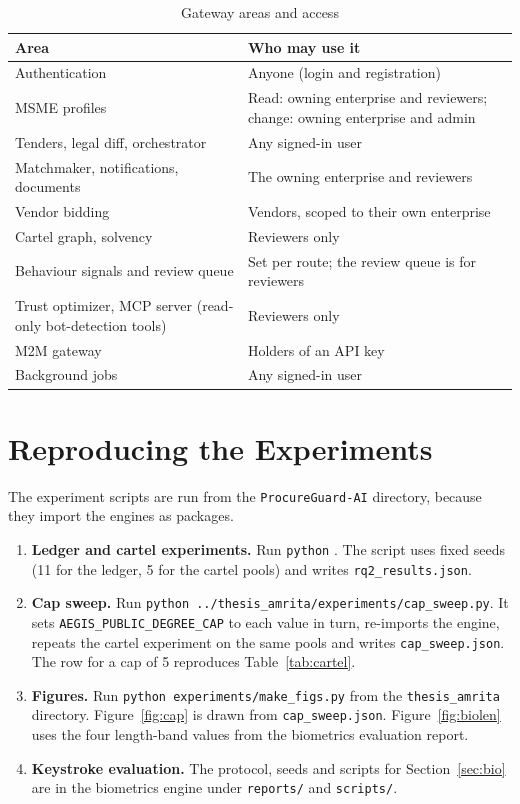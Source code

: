 \begin{table}[htbp]
\centering
\caption{Gateway areas and access}
\label{tab:api}
\small
\renewcommand{\arraystretch}{1.1}
\begin{tabularx}{\textwidth}{@{}>{\raggedright\arraybackslash}p{3.8cm}>{\raggedright\arraybackslash}X@{}}
\toprule
\textbf{Area} & \textbf{Who may use it} \\
\midrule
Authentication & Anyone (login and registration) \\
MSME profiles & Read: owning enterprise and reviewers; change: owning enterprise and admin \\
Tenders, legal diff, orchestrator & Any signed-in user \\
Matchmaker, notifications, documents & The owning enterprise and reviewers \\
Vendor bidding & Vendors, scoped to their own enterprise \\
Cartel graph, solvency & Reviewers only \\
Behaviour signals and review queue & Set per route; the review queue is for reviewers \\
Trust optimizer, MCP server (read-only bot-detection tools) & Reviewers only \\
M2M gateway & Holders of an API key \\
Background jobs & Any signed-in user \\
\bottomrule
\end{tabularx}
\end{table}

\chapter{Reproducing the Experiments}
\label{app:repro}

The experiment scripts are run from the \texttt{ProcureGuard-AI} directory, because they import the engines as packages.

\begin{enumerate}
    \item \textbf{Ledger and cartel experiments.} Run \texttt{python} {\small{}}. The script uses fixed seeds (11 for the ledger, 5 for the cartel pools) and writes \texttt{rq2\_results.json}.
    \item \textbf{Cap sweep.} Run \texttt{python ../thesis\_amrita/experiments/cap\_sweep.py}. It sets \texttt{AEGIS\_PUBLIC\_DEGREE\_CAP} to each value in turn, re-imports the engine, repeats the cartel experiment on the same pools and writes \texttt{cap\_sweep.json}. The row for a cap of 5 reproduces Table~\ref{tab:cartel}.
    \item \textbf{Figures.} Run \texttt{python experiments/make\_figs.py} from the \texttt{thesis\_amrita} directory. Figure~\ref{fig:cap} is drawn from \texttt{cap\_sweep.json}. Figure~\ref{fig:biolen} uses the four length-band values from the biometrics evaluation report.
    \item \textbf{Keystroke evaluation.} The protocol, seeds and scripts for Section~\ref{sec:bio} are in the biometrics engine under \texttt{reports/} and \texttt{scripts/}.
\end{enumerate}
